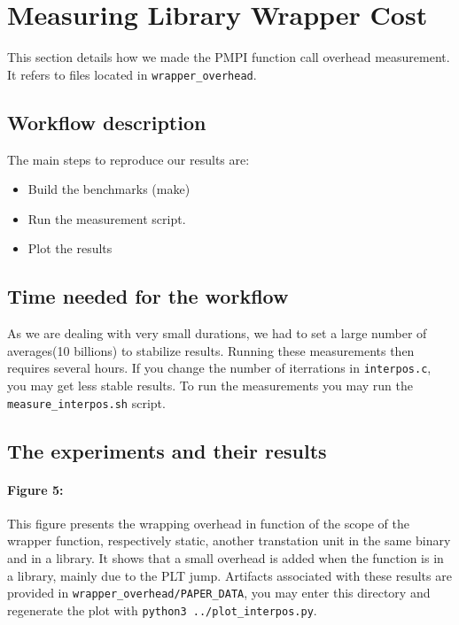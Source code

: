 \section{Measuring Library Wrapper Cost}
\label{sec:wrapper}

This section details how we made the PMPI function call overhead measurement. It refers to files located in \texttt{wrapper\_overhead}.
\subsection{Workflow description}

The main steps to reproduce our results are:

\begin{itemize}
\item Build the benchmarks (make)
\item Run the measurement script.
\item Plot the results
\end{itemize}

\subsection{Time needed for the workflow}

As we are dealing with very small durations, we had to set a large number of averages(10 billions) to stabilize results. Running these measurements then requires several hours. If you change the number of iterrations in \texttt{interpos.c}, you may get less stable results. To run the measurements you may run the \texttt{measure\_interpos.sh} script.

\subsection{The experiments and their results}

\paragraph*{\textbf{Figure 5:}} This figure presents the wrapping overhead in function of the scope of the wrapper function, respectively static, another transtation unit in the same binary and in a library. It shows that a small overhead is added when the function is in a library, mainly due to the PLT jump. Artifacts associated with these results are provided in \texttt{wrapper\_overhead/PAPER\_DATA}, you may enter this directory and regenerate the plot with \texttt{python3 ../plot\_interpos.py}.


